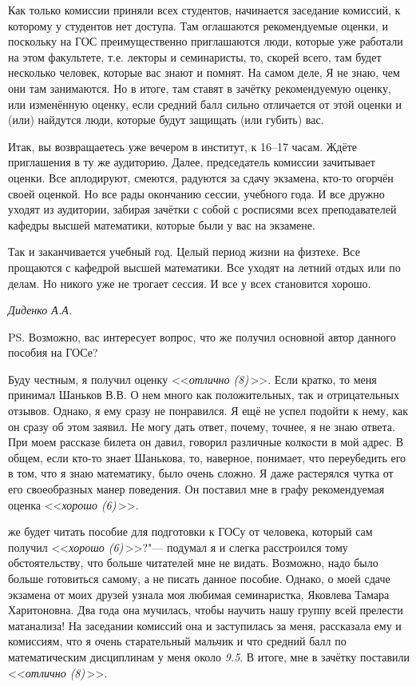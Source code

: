 Как только комиссии приняли всех студентов, начинается заседание комиссий, к которому у студентов нет доступа. Там оглашаются рекомендуемые оценки, и поскольку на ГОС преимущественно приглашаются люди, которые уже работали на этом факультете, т.е. лекторы и семинаристы, то, скорей всего, там будет несколько человек, которые вас знают и помнят. На самом деле, Я не знаю, чем они там занимаются. Но в итоге, там ставят в зачётку рекомендуемую оценку, или изменённую оценку, если средний балл сильно отличается от этой оценки и (или) найдутся люди, которые будут защищать (или губить) вас.

Итак, вы возвращаетесь уже вечером в институт, к 16--17 часам. Ждёте приглашения в ту же аудиторию. Далее, председатель комиссии зачитывает оценки. Все аплодируют, смеются, радуются за сдачу экзамена, кто-то огорчён своей оценкой. Но все рады окончанию сессии, учебного года. И все дружно уходят из аудитории, забирая зачётки с собой с росписями всех преподавателей кафедры высшей математики, которые были у вас на экзамене.

Так и заканчивается учебный год. Целый период жизни на физтехе. Все прощаются с кафедрой высшей математики. Все уходят на летний отдых или по делам. Но никого уже не трогает сессия. И все у всех становится хорошо. 

\mbox{}

\noindent\textit{Диденко А.А.}

\mbox{}

PS. Возможно, вас интересует вопрос, что же получил основной автор данного пособия на ГОСе? 

Буду честным, я получил оценку <<\textit{отлично (8)}\,>>. Если кратко, то меня принимал Шаньков В.В. О нем много как положительных, так и отрицательных отзывов. Однако, я ему сразу не понравился. Я ещё не успел подойти к нему, как он сразу об этом заявил. Не могу дать ответ, почему, точнее, я не знаю ответа. При моем рассказе билета он давил, говорил различные колкости в мой адрес.  В общем, если кто-то знает Шанькова, то, наверное, понимает, что переубедить его в том, что я знаю математику, было очень сложно. Я даже растерялся чутка от его своеобразных манер поведения. Он поставил мне в графу рекомендуемая оценка <<\textit{хорошо (6)}\,>>. 

 же будет читать пособие для подготовки к ГОСу от человека, который сам получил <<\textit{хорошо (6)}\,>>?\grqq "--- подумал я и слегка расстроился тому обстоятельству, что больше читателей мне не видать. Возможно, надо было больше готовиться самому, а не писать данное пособие. Однако, о моей сдаче экзамена от моих друзей узнала моя любимая семинаристка, Яковлева Тамара Харитоновна. Два года она мучилась, чтобы научить нашу группу всей прелести матанализа! На заседании комиссий она и заступилась за меня, рассказала ему и комиссиям, что я очень старательный мальчик и что средний балл по математическим дисциплинам у меня около \textit{9.5}. В итоге, мне в зачётку поставили <<\textit{отлично (8)}\,>>. 

